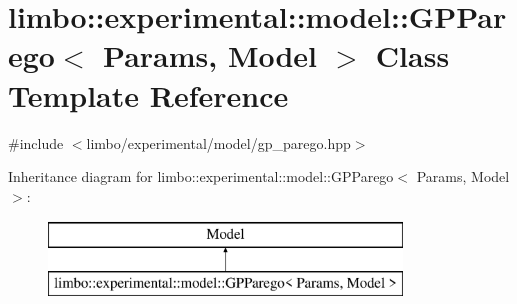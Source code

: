 \hypertarget{classlimbo_1_1experimental_1_1model_1_1_g_p_parego}{}\section{limbo\+:\+:experimental\+:\+:model\+:\+:G\+P\+Parego$<$ Params, Model $>$ Class Template Reference}
\label{classlimbo_1_1experimental_1_1model_1_1_g_p_parego}


{\ttfamily \#include $<$limbo/experimental/model/gp\+\_\+parego.\+hpp$>$}

Inheritance diagram for limbo\+:\+:experimental\+:\+:model\+:\+:G\+P\+Parego$<$ Params, Model $>$\+:\begin{figure}[H]
\begin{center}
\leavevmode
\includegraphics[height=2.000000cm]{classlimbo_1_1experimental_1_1model_1_1_g_p_parego}
\end{center}
\end{figure}
